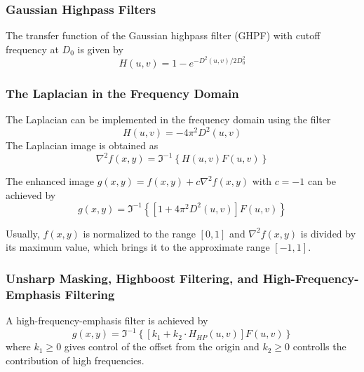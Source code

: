\subsubsection{Gaussian Highpass Filters}
The transfer function of the Gaussian highpass filter (GHPF) with cutoff frequency at $D_0$ is given by
\begin{equation}
	H(u,v) = 1 - e^{-D^2(u,v)/2D_0^2}
\end{equation}

\subsubsection{The Laplacian in the Frequency Domain }
The Laplacian can be implemented in the frequency domain using the filter
\begin{equation}
	H(u,v) = -4 \pi^2 D^2(u,v)
\end{equation}
The Laplacian image is obtained as
\begin{equation}
	\nabla^2 f(x,y) = \Im^{-1} \left\lbrace H(u,v)F(u,v) \right\rbrace 
\end{equation}

The enhanced image $g(x,y) = f(x,y) + c \nabla^2f(x,y)$ with $c=-1$ can be achieved by
\begin{equation}
	g(x,y) = \Im^{-1} \left\lbrace \left[ 1 + 4 \pi^2 D^2(u,v) \right] F(u,v) \right\rbrace 
\end{equation}

Usually, $f(x,y)$ is normalized to the range $\left[0,1\right]$ and $\nabla^2 f(x,y)$ is divided by its maximum value, which brings it to the approximate range $\left[-1,1\right]$.

\subsubsection{Unsharp Masking, Highboost Filtering, and High-Frequency-Emphasis Filtering }
A high-frequency-emphasis filter is achieved by
\begin{equation}
	g(x,y) = \Im^{-1} \left\lbrace \left[ k_1 + k_2 \cdot H_{HP}(u,v) \right] F(u,v) \right\rbrace 
\end{equation}
where $k_1 \geq 0$ gives control of the offset from the origin and $k_2 \geq 0$ controlls the contribution of high frequencies.

